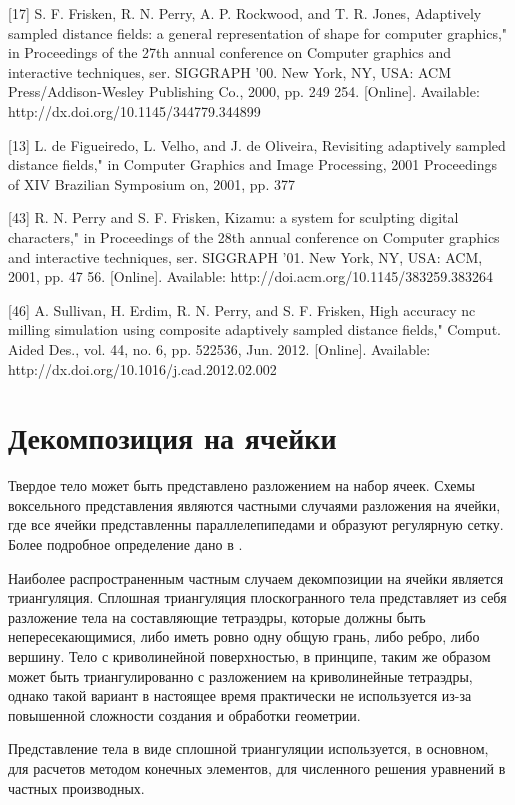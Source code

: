 [17] S. F. Frisken, R. N. Perry, A. P. Rockwood, and T. R. Jones, Adaptively
sampled distance fields: a general representation of shape for computer
graphics," in Proceedings of the 27th annual conference on Computer graphics
and interactive techniques, ser. SIGGRAPH ’00. New York, NY, USA: ACM
Press/Addison-Wesley Publishing Co., 2000, pp. 249 254. [Online]. Available:
http://dx.doi.org/10.1145/344779.344899

[13] L. de Figueiredo, L. Velho, and J. de Oliveira, Revisiting adaptively sampled
distance fields," in Computer Graphics and Image Processing, 2001 Proceedings
of XIV Brazilian Symposium on, 2001, pp. 377

[43] R. N. Perry and S. F. Frisken, Kizamu: a system for sculpting digital
characters," in Proceedings of the 28th annual conference on Computer graphics
and interactive techniques, ser. SIGGRAPH ’01. New York, NY, USA: ACM,
2001, pp. 47 56. [Online]. Available: http://doi.acm.org/10.1145/383259.383264

[46] A. Sullivan, H. Erdim, R. N. Perry, and S. F. Frisken, High accuracy
nc milling simulation using composite adaptively sampled distance fields,"
Comput. Aided Des., vol. 44, no. 6, pp. 522536, Jun. 2012. [Online]. Available:
http://dx.doi.org/10.1016/j.cad.2012.02.002

\section{Декомпозиция на ячейки} \label{sect_cell_decompositions}

Твердое тело может быть представлено разложением на набор ячеек. Схемы воксельного представления являются частными случаями разложения на ячейки, где все ячейки представленны параллелепипедами и образуют регулярную сетку. Более подробное определение дано в \cite{Requicha80}.

Наиболее распространенным частным случаем декомпозиции на ячейки является триангуляция. Сплошная триангуляция плоскогранного тела представляет из себя разложение тела на составляющие тетраэдры, которые должны быть непересекающимися, либо иметь ровно одну общую грань, либо ребро, либо вершину. Тело с криволинейной поверхностью, в принципе, таким же образом может быть триангулированно с разложением на криволинейные тетраэдры, однако такой вариант в настоящее время практически не используется из-за повышенной сложности создания и обработки геометрии.

Представление тела в виде сплошной триангуляции используется, в основном, для расчетов методом конечных элементов, для численного решения уравнений в частных производных.

